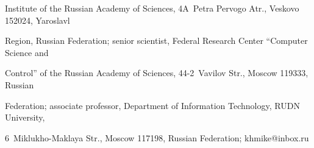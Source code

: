 Institute of the Russian Academy of Sciences, 4A~Petra Pervogo Atr., Veskovo 152024, Yaroslavl 


Region, Russian Federation; senior scientist, Federal Research Center ``Computer Science and 


Control'' of the Russian Academy of Sciences, 44-2~Vavilov Str., Moscow 119333, Russian 


Federation; associate professor, Department of Information Technology, RUDN University,  


6~Miklukho-Maklaya Str., Moscow 117198, Russian Federation; \mbox{khmike@inbox.ru}





  








\label{end\stat}





\renewcommand{\bibname}{\protect\rm Литература} 


    


